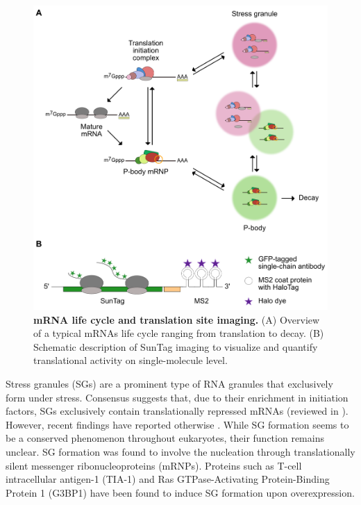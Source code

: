\begin{figure}[b!]
    \centering
    \includegraphics[width=\linewidth]{images/figure1}
    \caption{\textbf{mRNA life cycle and translation site imaging.}
        (A) Overview of a typical mRNAs life cycle ranging from
            translation to decay.
        (B) Schematic description of SunTag imaging to visualize and quantify
            translational activity on single-molecule level.
    }
    \label{fig:introduction}
\end{figure}

Stress granules (SGs) are a prominent type of RNA granules that exclusively form
    under stress.
Consensus suggests that, due to their enrichment in initiation factors,
    SGs exclusively contain translationally repressed mRNAs (reviewed in \cite{thomas_rna_2011}).
However, recent findings have reported otherwise \cite{mateju_single-molecule_2020}.
While SG formation seems to be a conserved phenomenon throughout eukaryotes,
    their function remains unclear.
SG formation was found to involve the nucleation through translationally silent messenger ribonucleoproteins (mRNPs).
Proteins such as T-cell intracellular antigen-1 (TIA-1) \cite{kedersha_rna-binding_1999} and Ras GTPase-Activating Protein-Binding
    Protein 1 (G3BP1) \cite{tourriere_rasgap-associated_2003} have been found to induce SG formation upon overexpression.

